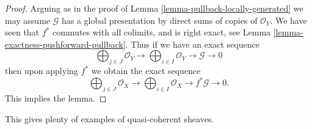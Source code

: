 \begin{proof}
Arguing as in the proof of Lemma \ref{lemma-pullback-locally-generated}
we may assume $\mathcal{G}$ has a global presentation by
direct sums of copies of $\mathcal{O}_Y$.
We have seen that $f^*$ commutes with all colimits,
and is right exact, see Lemma \ref{lemma-exactness-pushforward-pullback}.
Thus if we have an exact sequence
$$
\bigoplus\nolimits_{j \in J}
\mathcal{O}_Y
\longrightarrow
\bigoplus\nolimits_{i \in I}
\mathcal{O}_Y
\longrightarrow
\mathcal{G}
\longrightarrow
0
$$
then upon applying $f^*$ we obtain the exact sequence
$$
\bigoplus\nolimits_{j \in J}
\mathcal{O}_X
\longrightarrow
\bigoplus\nolimits_{i \in I}
\mathcal{O}_X
\longrightarrow
f^*\mathcal{G}
\longrightarrow
0.
$$
This implies the lemma.
\end{proof}

\noindent
This gives plenty of examples of quasi-coherent sheaves.

